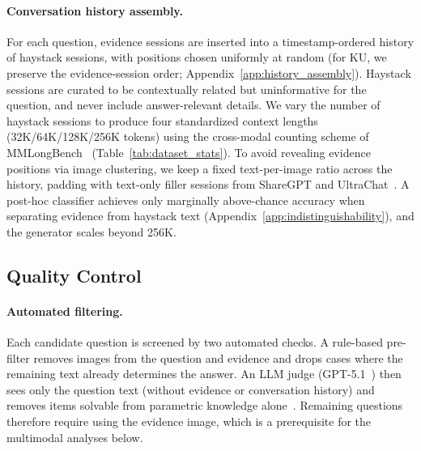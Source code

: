 \documentclass{llmxive}
\begin{document}
\paragraph{Conversation history assembly.}
For each question, evidence sessions are inserted into a timestamp-ordered history of haystack sessions, with positions chosen uniformly at random (for KU, we preserve the evidence-session order; Appendix~\ref{app:history_assembly}). Haystack sessions are curated to be contextually related but uninformative for the question, and never include answer-relevant details. We vary the number of haystack sessions to produce four standardized context lengths (32K/64K/128K/256K tokens) using the cross-modal counting scheme of MMLongBench~\cite{mmlongbench} (Table~\ref{tab:dataset_stats}). To avoid revealing evidence positions via image clustering, we keep a fixed text-per-image ratio across the history, padding with text-only filler sessions from ShareGPT and UltraChat~\cite{ding2023enhancing}. A post-hoc classifier achieves only marginally above-chance accuracy when separating evidence from haystack text (Appendix~\ref{app:indistinguishability}), and the generator scales beyond 256K.



\subsection{Quality Control}
\label{subsec:quality_control}

\paragraph{Automated filtering.}
Each candidate question is screened by two automated checks. A rule-based pre-filter removes images from the question and evidence and drops cases where the remaining text already determines the answer. An LLM judge (GPT-5.1~\citep{singh2025openaigpt5card}) then sees only the question text (without evidence or conversation history) and removes items solvable from parametric knowledge alone~\cite{mallen2023not}. Remaining questions therefore require using the evidence image, which is a prerequisite for the multimodal analyses below.
\end{document}
